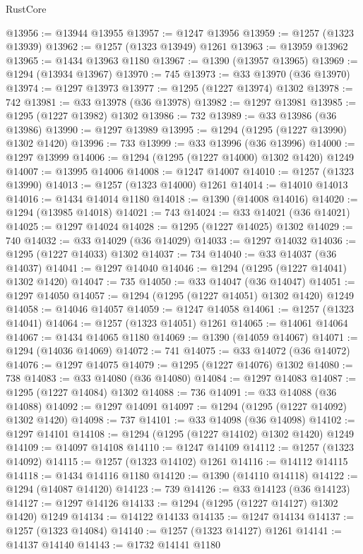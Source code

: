\begin{lexlean}{RustCore}
\begin{coremodule}
@13956 := @13944 @13955
@13957 := @1247 @13956
@13959 := @1257 (@1323 @13939)
@13962 := @1257 (@1323 @13949) @1261
@13963 := @13959 @13962
@13965 := @1434 @13963 @1180
@13967 := @1390 (@13957 @13965)
@13969 := @1294 (@13934 @13967)
@13970 := 745
@13973 := @33 @13970 (@36 @13970)
@13974 := @1297 @13973
@13977 := @1295 (@1227 @13974) @1302
@13978 := 742
@13981 := @33 @13978 (@36 @13978)
@13982 := @1297 @13981
@13985 := @1295 (@1227 @13982) @1302
@13986 := 732
@13989 := @33 @13986 (@36 @13986)
@13990 := @1297 @13989
@13995 := @1294 (@1295 (@1227 @13990) @1302 @1420)
@13996 := 733
@13999 := @33 @13996 (@36 @13996)
@14000 := @1297 @13999
@14006 := @1294 (@1295 (@1227 @14000) @1302 @1420) @1249
@14007 := @13995 @14006
@14008 := @1247 @14007
@14010 := @1257 (@1323 @13990)
@14013 := @1257 (@1323 @14000) @1261
@14014 := @14010 @14013
@14016 := @1434 @14014 @1180
@14018 := @1390 (@14008 @14016)
@14020 := @1294 (@13985 @14018)
@14021 := 743
@14024 := @33 @14021 (@36 @14021)
@14025 := @1297 @14024
@14028 := @1295 (@1227 @14025) @1302
@14029 := 740
@14032 := @33 @14029 (@36 @14029)
@14033 := @1297 @14032
@14036 := @1295 (@1227 @14033) @1302
@14037 := 734
@14040 := @33 @14037 (@36 @14037)
@14041 := @1297 @14040
@14046 := @1294 (@1295 (@1227 @14041) @1302 @1420)
@14047 := 735
@14050 := @33 @14047 (@36 @14047)
@14051 := @1297 @14050
@14057 := @1294 (@1295 (@1227 @14051) @1302 @1420) @1249
@14058 := @14046 @14057
@14059 := @1247 @14058
@14061 := @1257 (@1323 @14041)
@14064 := @1257 (@1323 @14051) @1261
@14065 := @14061 @14064
@14067 := @1434 @14065 @1180
@14069 := @1390 (@14059 @14067)
@14071 := @1294 (@14036 @14069)
@14072 := 741
@14075 := @33 @14072 (@36 @14072)
@14076 := @1297 @14075
@14079 := @1295 (@1227 @14076) @1302
@14080 := 738
@14083 := @33 @14080 (@36 @14080)
@14084 := @1297 @14083
@14087 := @1295 (@1227 @14084) @1302
@14088 := 736
@14091 := @33 @14088 (@36 @14088)
@14092 := @1297 @14091
@14097 := @1294 (@1295 (@1227 @14092) @1302 @1420)
@14098 := 737
@14101 := @33 @14098 (@36 @14098)
@14102 := @1297 @14101
@14108 := @1294 (@1295 (@1227 @14102) @1302 @1420) @1249
@14109 := @14097 @14108
@14110 := @1247 @14109
@14112 := @1257 (@1323 @14092)
@14115 := @1257 (@1323 @14102) @1261
@14116 := @14112 @14115
@14118 := @1434 @14116 @1180
@14120 := @1390 (@14110 @14118)
@14122 := @1294 (@14087 @14120)
@14123 := 739
@14126 := @33 @14123 (@36 @14123)
@14127 := @1297 @14126
@14133 := @1294 (@1295 (@1227 @14127) @1302 @1420) @1249
@14134 := @14122 @14133
@14135 := @1247 @14134
@14137 := @1257 (@1323 @14084)
@14140 := @1257 (@1323 @14127) @1261
@14141 := @14137 @14140
@14143 := @1732 @14141 @1180

\end{coremodule}
\end{lexlean}
